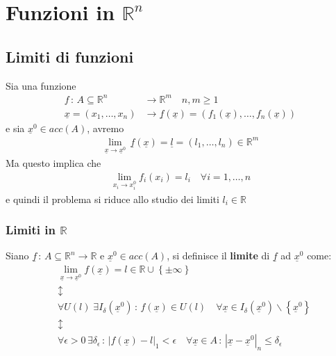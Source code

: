 \chapter{Funzioni in $\mathbb{R}^n$}

\section{Limiti di funzioni}

Sia una funzione
\begin{align}
f \, : \, A\subseteq \mathbb{R}^n {}&\longrightarrow \mathbb{R}^m \quad n,m\geq 1\\
\underline{x}=(x_1,\dots,x_n) &\longrightarrow \underline{f}(\underline{x})=(f_1(\underline{x}), \dots , f_n(\underline{x})) \nonumber
\end{align}
e sia $\underline{x}^0 \in acc(A)$, avremo
\begin{align}
\underset{\underline{x} \rightarrow \underline{x}^0}{\lim}\,\underline{f}(\underline{x})=\underline{l}=(l_1,\dots,l_n)\in \mathbb{R}^m
\end{align}
Ma questo implica che
\begin{align}
\underset{x_i\rightarrow x_i^0}{\lim} f_i(x_i)=l_i \quad \forall i =1,\dots,n
\end{align}
e quindi il problema si riduce allo studio dei limiti $l_i \in \mathbb{R}$

\subsection{Limiti in $\mathbb{R}$}

Siano $\underline{f} \, : \, A\subseteq \mathbb{R}^n \longrightarrow \mathbb{R}$ e $\underline{x}^0 \in acc(A)$, si definisce il \textbf{limite} di $\underline{f}$ ad $\underline{x}^0$ come:
\begin{align}
{}&\underset{\underline{x}\rightarrow\underline{x}^0}{\lim}f(\underline{x})=l \in \mathbb{R}\cup \left\{\pm \infty \right\}\\ 
&\updownarrow \nonumber \\ 
&\forall U(l) \; \exists I_\delta(\underline{x}^0) \, : \, f(\underline{x}) \in U(l) \quad \forall \underline{x}\in I_\delta(\underline{x}^0)\backslash\left\{\underline{x}^0\right\}\\ 
&\updownarrow \nonumber \\ 
&\forall \epsilon>0 \, \exists \delta_\epsilon \, : \, |f(\underline{x}) - l|_1<\epsilon \quad \forall \underline{x}\in A \, : \, |\underline{x} - \underline{x}^0|_n\leq \delta_\epsilon
\end{align}

